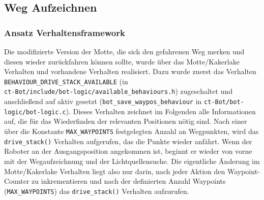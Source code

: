 \subsection{Weg Aufzeichnen}
\label{weg-aufzeichnen}

\subsubsection{Ansatz Verhaltensframework}
Die modifizierte Version der Motte, die sich den gefahrenen Weg merken und diesen
wieder zurückfahren können sollte, wurde über das Motte/Kakerlake Verhalten und
vorhandene Verhalten realisiert.
Dazu wurde zuerst das Verhalten  \\ 
\verb+BEHAVIOUR_DRIVE_STACK_AVAILABLE+ (in \\ \verb+ct-Bot/include/bot-logic/available_behaviours.h+) zugeschaltet und anschließend
auf aktiv gesetzt (\verb+bot_save_waypos_behaviour+ in
\verb+ct-Bot/bot-logic/bot-logic.c+). Dieses Verhalten zeichnet im Folgenden
alle Informationen auf, die für das Wiederfinden der relevanten Positionen nötig sind.
Nach einer über die Konstante \verb+MAX_WAYPOINTS+ festgelegten Anzahl an Wegpunkten,
wird das \verb+drive_stack()+ Verhalten aufgerufen, das die Punkte wieder anfährt.
Wenn der Roboter an der Ausgangsposition angekommen ist, beginnt er wieder von vorne mit
der Wegaufzeichnung und der Lichtquellensuche. Die eigentliche Änderung im
Motte/Kakerlake Verhalten liegt also nur darin, nach jeder Aktion den Waypoint-Counter
zu inkrementieren und nach der definierten Anzahl Waypoints (\verb+MAX_WAYPOINTS+) das
\verb+drive_stack()+ Verhalten aufzurufen.
